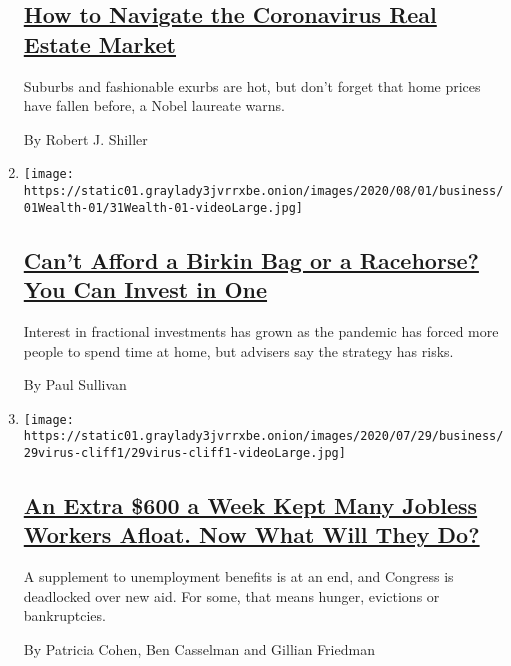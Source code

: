 \begin{enumerate}
{  \subsection{\texorpdfstring{\href{/2020/07/31/business/housing-market-prices-risk.html}{How
  to Navigate the Coronavirus Real Estate
  Market}}{How to Navigate the Coronavirus Real Estate Market}}\label{how-to-navigate-the-coronavirus-real-estate-market}}

  Suburbs and fashionable exurbs are hot, but don't forget that home
  prices have fallen before, a Nobel laureate warns.

  By Robert J. Shiller
\item
  \texttt{[image: https://static01.graylady3jvrrxbe.onion/images/2020/08/01/business/01Wealth-01/31Wealth-01-videoLarge.jpg]}

  \hypertarget{cant-afford-a-birkin-bag-or-a-racehorse-you-can-invest-in-one}{%
  \subsection{\texorpdfstring{\href{/2020/07/31/your-money/birkin-bag-racehorse-invest.html}{Can't
  Afford a Birkin Bag or a Racehorse? You Can Invest in
  One}}{Can't Afford a Birkin Bag or a Racehorse? You Can Invest in One}}\label{cant-afford-a-birkin-bag-or-a-racehorse-you-can-invest-in-one}}

  Interest in fractional investments has grown as the pandemic has
  forced more people to spend time at home, but advisers say the
  strategy has risks.

  By Paul Sullivan
\item
  \texttt{[image: https://static01.graylady3jvrrxbe.onion/images/2020/07/29/business/29virus-cliff1/29virus-cliff1-videoLarge.jpg]}

  \hypertarget{an-extra-600-a-week-kept-many-jobless-workers-afloat-now-what-will-they-do}{%
  \subsection{\texorpdfstring{\href{/2020/07/29/business/economy/unemployment-benefits-coronavirus.html}{An
  Extra \$600 a Week Kept Many Jobless Workers Afloat. Now What Will
  They
  Do?}}{An Extra \$600 a Week Kept Many Jobless Workers Afloat. Now What Will They Do?}}\label{an-extra-600-a-week-kept-many-jobless-workers-afloat-now-what-will-they-do}}

  A supplement to unemployment benefits is at an end, and Congress is
  deadlocked over new aid. For some, that means hunger, evictions or
  bankruptcies.

  By Patricia Cohen, Ben Casselman and Gillian Friedman
\end{enumerate}

